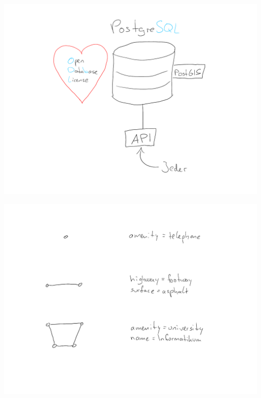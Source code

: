 \documentclass{beamer}
\begin{document}
	\begin{frame}
		\begin{center}
			\includegraphics[width=\linewidth]{images/database-6}
		\end{center}
	\end{frame}
	
	
	\begin{frame}
		\begin{center}
			\includegraphics[width=\linewidth]{images/datamodel}
		\end{center}
	\end{frame}
	
\end{document}

